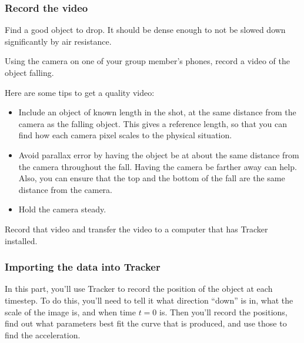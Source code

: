\subsubsection{Record the video}

\begin{steps}
	\item Find a good object to drop. It should be dense enough to not be slowed down significantly by air resistance.
	
	\item Using the camera on one of your group member's phones, record a video of the object falling.
	
	Here are some tips to get a quality video:
	\begin{itemize}
		\item Include an object of known length in the shot, at the same distance from the camera as the falling object. This gives a reference length, so that you can find how each camera pixel scales to the physical situation.
		
		\item Avoid parallax error by having the object be at about the same distance from the camera throughout the fall. Having the camera be farther away can help. Also, you can ensure that the top and the bottom of the fall are the same distance from the camera.
		
		\item Hold the camera steady.
	\end{itemize}

	\item Record that video and transfer the video to a computer that has Tracker installed.
\end{steps}

\subsubsection{Importing the data into Tracker}

In this part, you'll use Tracker to record the position of the object at each timestep. To do this, you'll need to tell it what direction ``down'' is in, what the scale of the image is, and when time $t=0$ is. Then you'll record the positions, find out what parameters best fit the curve that is produced, and use those to find the acceleration.

